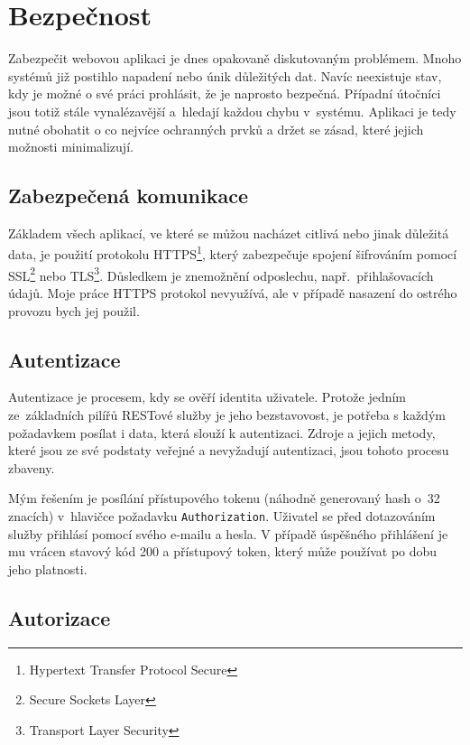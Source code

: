 \section{Bezpečnost}
\label{sec:security}


Zabezpečit webovou aplikaci je dnes opakovaně diskutovaným problémem. Mnoho systémů již postihlo napadení
nebo únik důležitých dat. Navíc neexistuje stav, kdy je možné o své práci prohlásit, že je naprosto
bezpečná. Případní útočníci jsou totiž stále vynalézavější a~hledají každou chybu v~systému.
Aplikaci je tedy nutné obohatit o co nejvíce ochranných prvků a držet se zásad,
které jejich možnosti minimalizují.

\subsection{Zabezpečená komunikace}

Základem všech aplikací, ve které se můžou nacházet citlivá nebo jinak důležitá data,
je použití protokolu HTTPS\footnote{Hypertext Transfer Protocol Secure},
který zabezpečuje spojení šifrováním pomocí SSL\footnote{Secure Sockets Layer} nebo TLS\footnote{Transport Layer Security}.
Důsledkem je znemožnění odposlechu, např.~přihlašovacích údajů. Moje práce HTTPS protokol nevyužívá,
ale v případě nasazení do ostrého provozu bych jej použil.

\subsection{Autentizace}

Autentizace je procesem, kdy se ověří identita uživatele. Protože jedním ze~základních pilířů RESTové
služby je jeho bezstavovost, je potřeba s každým požadavkem posílat i data, která slouží k autentizaci.
Zdroje a jejich metody, které jsou ze své podstaty veřejné a nevyžadují autentizaci, jsou tohoto procesu zbaveny.

Mým řešením je posílání přístupového tokenu (náhodně generovaný hash o~32 znacích) v~hlavičce požadavku
\texttt{Authorization}. Uživatel se před dotazováním služby přihlásí pomocí svého e-mailu a hesla.
V případě úspěšného přihlášení je mu vrácen stavový kód 200 a přístupový token, který může používat po dobu jeho platnosti.

\subsection{Autorizace}

